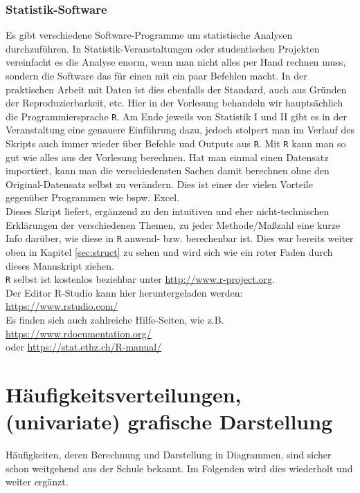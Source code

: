 \documentclass[a4paper]{article}
\begin{document}
\subsubsection{Statistik-Software}
Es gibt verschiedene Software-Programme um statistische Analysen durchzuführen. In Statistik-Veranstaltungen oder studentischen Projekten vereinfacht es die Analyse enorm, wenn man nicht alles per Hand rechnen muss, sondern die Software das für einen mit ein paar Befehlen macht. In der praktischen Arbeit mit Daten ist dies ebenfalls der Standard, auch aus Gründen der Reproduzierbarkeit, etc. Hier in der Vorlesung behandeln wir hauptsächlich die Programmiersprache \texttt{R}. Am Ende jeweils von Statistik I und II gibt es in der Veranstaltung eine genauere Einführung dazu, jedoch stolpert man im Verlauf des Skripts auch immer wieder über Befehle und Outputs aus \texttt{R}.
Mit \texttt{R} kann man so gut wie alles aus der Vorlesung berechnen. Hat man einmal einen Datensatz importiert, kann man die verschiedensten Sachen damit berechnen ohne den Original-Datensatz selbst zu verändern. Dies ist einer der vielen Vorteile gegenüber Programmen wie bspw. Excel.\\

\noindent Dieses Skript liefert, ergänzend zu den intuitiven und eher nicht-technischen Erklärungen der verschiedenen Themen, zu jeder Methode/Maßzahl eine kurze Info darüber, wie diese in \texttt{R} anwend- bzw. berechenbar ist. Dies war bereits weiter oben in Kapitel \ref{sec:struct} zu sehen und wird sich wie ein roter Faden durch dieses Manuskript ziehen.\\

\noindent \texttt{R} selbst ist kostenlos beziehbar unter \hfill \href{http://www.r-project.org}{http://www.r-project.org}.\\
\noindent Der Editor R-Studio kann hier heruntergeladen werden: \hfill \href{https://www.rstudio.com/}{https://www.rstudio.com/}\\
\noindent Es finden sich auch zahlreiche Hilfe-Seiten, wie z.B. \hfill \href{https://www.rdocumentation.org/}{https://www.rdocumentation.org/}\\
\noindent oder \hfill \href{https://stat.ethz.ch/R-manual/}{https://stat.ethz.ch/R-manual/}\\



\newpage


\section{Häufigkeitsverteilungen, (univariate) grafische Darstellung}
Häufigkeiten, deren Berechnung und Darstellung in Diagrammen, sind sicher schon weitgehend aus der Schule bekannt. Im Folgenden wird dies wiederholt und weiter ergänzt.
\end{document}
